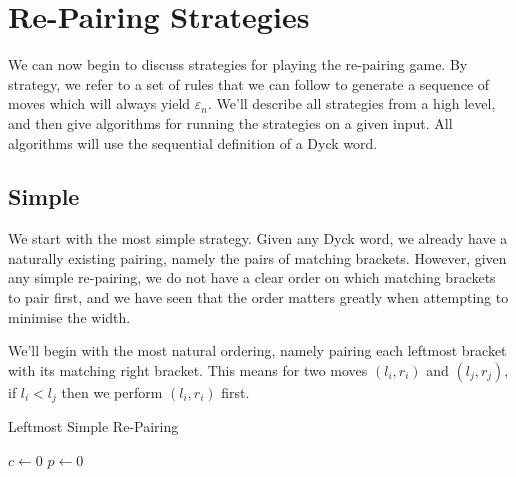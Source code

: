 \section{Re-Pairing Strategies}

We can now begin to discuss strategies for playing the re-pairing game. By strategy, we refer to a set of rules that we can follow to generate a sequence of moves which will always yield $\varepsilon_n$. We'll describe all strategies from a high level, and then give algorithms for running the strategies on a given input. All algorithms will use the sequential definition of a Dyck word.

\subsection{Simple}
We start with the most simple strategy. Given any Dyck word, we already have a naturally existing pairing, namely the pairs of matching brackets. However, given any simple re-pairing, we do not have a clear order on which matching brackets to pair first, and we have seen that the order matters greatly when attempting to minimise the width.

We'll begin with the most natural ordering, namely pairing each leftmost bracket with its matching right bracket. This means for two moves $(l_i, r_i)$ and $(l_j, r_j)$, if $l_i < l_j$ then we perform $(l_i, r_i)$ first.

\begin{algorithm}
    \caption{Leftmost Simple Re-Pairing}
    \begin{algorithmic}
        \State $c \gets 0$
        \State $p \gets 0$
    \end{algorithmic}
\end{algorithm}